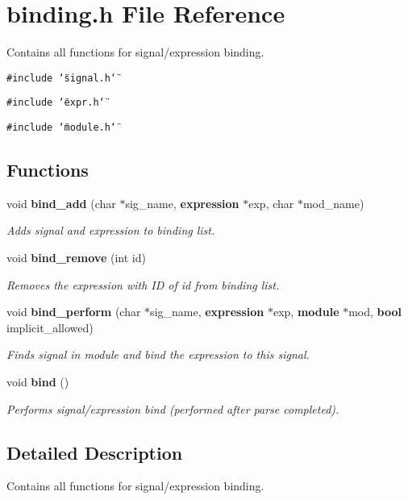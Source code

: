 \section{binding.h File Reference}
\label{binding_8h}
Contains all functions for signal/expression binding. 


{\tt \#include \char`\"{}signal.h\char`\"{}}\par
{\tt \#include \char`\"{}expr.h\char`\"{}}\par
{\tt \#include \char`\"{}module.h\char`\"{}}\par
\subsection*{Functions}
\begin{CompactItemize}
\item 
void {\bf bind\_\-add} (char $\ast$sig\_\-name, {\bf expression} $\ast$exp, char $\ast$mod\_\-name)
\begin{CompactList}\small\item\em Adds signal and expression to binding list.\item\end{CompactList}\item 
void {\bf bind\_\-remove} (int id)
\begin{CompactList}\small\item\em Removes the expression with ID of id from binding list.\item\end{CompactList}\item 
void {\bf bind\_\-perform} (char $\ast$sig\_\-name, {\bf expression} $\ast$exp, {\bf module} $\ast$mod, {\bf bool} implicit\_\-allowed)
\begin{CompactList}\small\item\em Finds signal in module and bind the expression to this signal.\item\end{CompactList}\item 
void {\bf bind} ()
\begin{CompactList}\small\item\em Performs signal/expression bind (performed after parse completed).\item\end{CompactList}\end{CompactItemize}


\subsection{Detailed Description}
Contains all functions for signal/expression binding.



